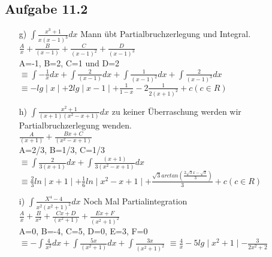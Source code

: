 \documentclass{standalone}
\begin{document}
\subsection{Aufgabe 11.2}
\begin{itemize}
	\item[g)]$\int \frac{x^3+1}{x(x-1)^3} dx$ Mann übt Partialbruchzerlegung und Integral.\\
			$\frac{A}{x}+\frac{B}{(x-1)}+\frac{C}{(x-1)^2}+\frac{D}{(x-1)^3}$\\
			A=-1, B=2, C=1 und D=2\\
			$\equiv \int-\frac{1}{x}dx+\int\frac{2}{(x-1)}dx+\int\frac{1}{(x-1)^2}dx+\int\frac{2}{(x-1)^3}dx$
			$\equiv -lg\mid x\mid +2lg\mid x-1\mid+\frac{1}{1-x}-2\frac{1}{2(x+1)^2}+c (c \in R)$\\

	\item[h)]$\int\frac{x^2+1}{(x+1)(x^2-x+1)}dx$ zu keiner Überraschung werden wir Partialbruchzerlegung wenden.\\
			$\frac{A}{(x+1)}+\frac{Bx+C}{(x^2-x+1)}$\\
			A=2/3, B=1/3, C=1/3\\
			$\equiv \int\frac{2}{3(x+1)}dx+\int\frac{(x+1)}{3(x^2-x+1)}dx$
			$\equiv \frac{2}{3}ln\mid x+1\mid+\frac{1}{6}ln\mid x^2-x+1\mid + \frac{\sqrt{3}arctan(\frac{2\sqrt{3}x-\sqrt{3}}{3})}{3}+c (c \in R)$
			
	\item[i)]$\int \frac{X^4-4}{x^2(x^2+1)^2}dx$ Noch Mal Partialintegration\\
		     $ \frac{A}{x}+\frac{B}{x^2}+\frac{Cx+D}{(x^2+1)}+\frac{Ex+F}{(x^2+1)^2}$\\
		     A=0, B=-4, C=5, D=0, E=3, F=0\\
		     $\equiv -\int\frac{4}{x^2}dx +\int \frac{5x}{(x^2+1)}dx + \int \frac{3x}{(x^2+1)^2} $
		     $\equiv \frac{4}{x}-5lg \mid x^2+1\mid-\frac{3}{2x^2+2}$
			 
\end{itemize}
\end{document}
